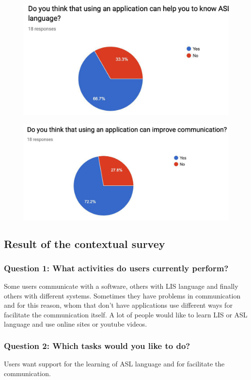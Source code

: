 \begin{figure}[h]
	\centering
	\includegraphics[width=0.7\linewidth]{"Figure/photo_2019-02-06_15-58-51 (2)"}
	\label{fig:photo2019-02-0615-58-51-2}
\end{figure}
\begin{figure}[h]
	\centering
	\includegraphics[width=0.7\linewidth]{Figure/photo_2019-02-06_15-58-51}
	\label{fig:photo2019-02-0615-58-51}
\end{figure}

\subsection{Result of the contextual survey}
\subsubsection{Question 1: What activities do users currently perform?}
Some users communicate with a software, others with LIS language and finally others with different systems. Sometimes they have problems in communication and for this reason, whom that don't have applications use different ways for facilitate the communication itself. A lot of people would like to learn LIS or ASL language and use online sites or youtube videos. 

\subsubsection{Question 2: Which tasks would you like to do?}
Users want support for the learning of ASL language and for facilitate the communication.

